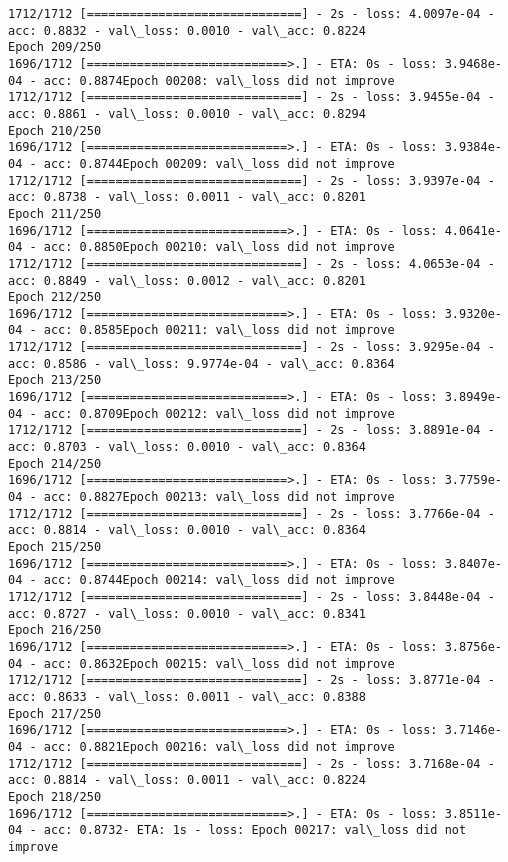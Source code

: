 \documentclass[11pt]{article}
\begin{document}
\begin{Verbatim}[commandchars=\\\{\}]
1712/1712 [==============================] - 2s - loss: 4.0097e-04 - acc: 0.8832 - val\_loss: 0.0010 - val\_acc: 0.8224
Epoch 209/250
1696/1712 [============================>.] - ETA: 0s - loss: 3.9468e-04 - acc: 0.8874Epoch 00208: val\_loss did not improve
1712/1712 [==============================] - 2s - loss: 3.9455e-04 - acc: 0.8861 - val\_loss: 0.0010 - val\_acc: 0.8294
Epoch 210/250
1696/1712 [============================>.] - ETA: 0s - loss: 3.9384e-04 - acc: 0.8744Epoch 00209: val\_loss did not improve
1712/1712 [==============================] - 2s - loss: 3.9397e-04 - acc: 0.8738 - val\_loss: 0.0011 - val\_acc: 0.8201
Epoch 211/250
1696/1712 [============================>.] - ETA: 0s - loss: 4.0641e-04 - acc: 0.8850Epoch 00210: val\_loss did not improve
1712/1712 [==============================] - 2s - loss: 4.0653e-04 - acc: 0.8849 - val\_loss: 0.0012 - val\_acc: 0.8201
Epoch 212/250
1696/1712 [============================>.] - ETA: 0s - loss: 3.9320e-04 - acc: 0.8585Epoch 00211: val\_loss did not improve
1712/1712 [==============================] - 2s - loss: 3.9295e-04 - acc: 0.8586 - val\_loss: 9.9774e-04 - val\_acc: 0.8364
Epoch 213/250
1696/1712 [============================>.] - ETA: 0s - loss: 3.8949e-04 - acc: 0.8709Epoch 00212: val\_loss did not improve
1712/1712 [==============================] - 2s - loss: 3.8891e-04 - acc: 0.8703 - val\_loss: 0.0010 - val\_acc: 0.8364
Epoch 214/250
1696/1712 [============================>.] - ETA: 0s - loss: 3.7759e-04 - acc: 0.8827Epoch 00213: val\_loss did not improve
1712/1712 [==============================] - 2s - loss: 3.7766e-04 - acc: 0.8814 - val\_loss: 0.0010 - val\_acc: 0.8364
Epoch 215/250
1696/1712 [============================>.] - ETA: 0s - loss: 3.8407e-04 - acc: 0.8744Epoch 00214: val\_loss did not improve
1712/1712 [==============================] - 2s - loss: 3.8448e-04 - acc: 0.8727 - val\_loss: 0.0010 - val\_acc: 0.8341
Epoch 216/250
1696/1712 [============================>.] - ETA: 0s - loss: 3.8756e-04 - acc: 0.8632Epoch 00215: val\_loss did not improve
1712/1712 [==============================] - 2s - loss: 3.8771e-04 - acc: 0.8633 - val\_loss: 0.0011 - val\_acc: 0.8388
Epoch 217/250
1696/1712 [============================>.] - ETA: 0s - loss: 3.7146e-04 - acc: 0.8821Epoch 00216: val\_loss did not improve
1712/1712 [==============================] - 2s - loss: 3.7168e-04 - acc: 0.8814 - val\_loss: 0.0011 - val\_acc: 0.8224
Epoch 218/250
1696/1712 [============================>.] - ETA: 0s - loss: 3.8511e-04 - acc: 0.8732- ETA: 1s - loss: Epoch 00217: val\_loss did not improve

\end{Verbatim}
\end{document}
